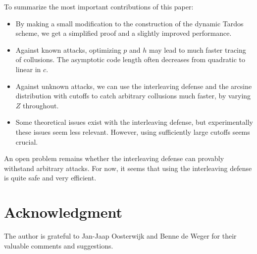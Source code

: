 \documentclass[10pt,a4paper,twocolumn]{article}
\begin{document}
\noindent To summarize the most important contributions of this paper:
\begin{itemize}
	\item By making a small modification to the construction of the dynamic Tardos scheme, we get a simplified proof and a slightly improved performance.
	\item Against known attacks, optimizing $p$ and $h$ may lead to much faster tracing of collusions. The asymptotic code length often decreases from quadratic to linear in $c$.
	\item Against unknown attacks, we can use the interleaving defense and the arcsine distribution with cutoffs to catch arbitrary collusions much faster, by varying $Z$ throughout. 
	\item Some theoretical issues exist with the interleaving defense, but experimentally these issues seem less relevant. However, using sufficiently large cutoffs seems crucial.
\end{itemize}
An open problem remains whether the interleaving defense can provably withstand arbitrary attacks. For now, it seems that using the interleaving defense is quite safe and very efficient.





\section*{Acknowledgment}

The author is grateful to Jan-Jaap Oosterwijk and Benne de Weger for their valuable comments and suggestions.







\end{document}
